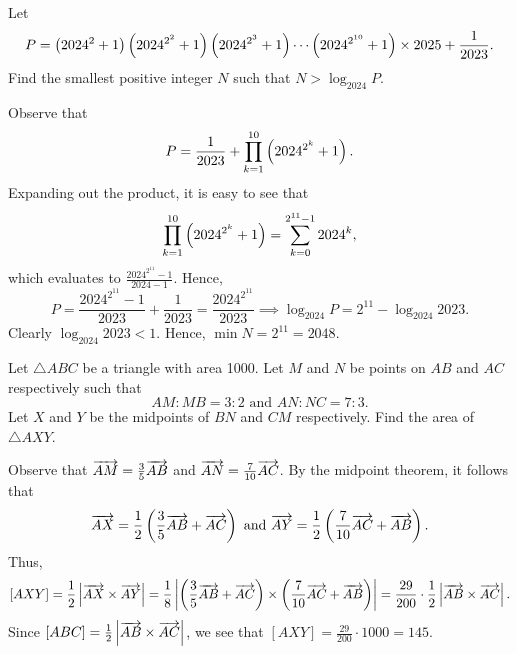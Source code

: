 \clearpage
\begin{question}[2048]\label{A::2024-S-1-10}
    Let \[P = \left( 2024^2 + 1 \right)\left( 2024^{2^2} + 1 \right)\left( 2024^{2^3} + 1 \right)\cdots\left( 2024^{2^{10}} + 1 \right) \times 2025 + \dfrac1{2023}.\] Find the smallest positive integer $N$ such that $N > \log_{2024} P$.
\end{question}

Observe that \[P = \frac1{2023} + \prod_{k = 1}^{10} \left( 2024^{2^k} + 1 \right).\] Expanding out the product, it is easy to see that \[\prod_{k = 1}^{10} \left( 2024^{2^k} + 1 \right) = \sum_{k = 0}^{2^{11} - 1} 2024^k,\] which evaluates to $\frac{2024^{2^{11}} - 1}{2024 - 1}$. Hence, \[P = \frac{2024^{2^{11}} - 1}{2023} + \frac1{2023} = \frac{2024^{2^{11}}}{2023} \implies \log_{2024} P = 2^{11} - \log_{2024} 2023.\] Clearly $\log_{2024} 2023 < 1$. Hence, $\min N = 2^{11} = 2048$.

\begin{question}[145]\label{A::2024-S-1-11}
    Let $\triangle ABC$ be a triangle with area 1000. Let $M$ and $N$ be points on $AB$ and $AC$ respectively such that \[AM : MB = 3 : 2 \text{ and } AN : NC = 7 : 3.\] Let $X$ and $Y$ be the midpoints of $BN$ and $CM$ respectively. Find the area of $\triangle AXY$.

    \begin{center}
    \end{center}
\end{question}

Observe that $\overrightarrow{AM} = \frac35 \overrightarrow{AB}$ and $\overrightarrow{AN} = \frac7{10} \overrightarrow{AC}$. By the midpoint theorem, it follows that \[\overrightarrow{AX} = \frac12 \left( \frac35 \overrightarrow{AB} + \overrightarrow{AC} \right) \text{ and } \overrightarrow{AY} = \frac12 \left( \frac7{10} \overrightarrow{AC} + \overrightarrow{AB} \right).\] Thus, \[[AXY] = \frac12 \left\lvert \overrightarrow{AX} \times \overrightarrow{AY} \right\rvert = \frac18 \left\lvert \left( \frac35 \overrightarrow{AB} + \overrightarrow{AC} \right) \times \left( \frac7{10} \overrightarrow{AC} + \overrightarrow{AB} \right) \right\rvert = \frac{29}{200} \cdot \frac12 \left\lvert \overrightarrow{AB} \times \overrightarrow{AC} \right\rvert.\] Since $[ABC] = \frac12 \left\lvert \overrightarrow{AB} \times \overrightarrow{AC} \right\rvert$, we see that $[AXY] = \frac{29}{200} \cdot 1000 = 145$.

